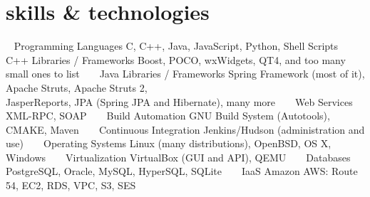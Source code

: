 \section{skills \& technologies}

\begin{entrylist}
    \entry
        {~}
        {Programming Languages}
        {C, C++, Java, JavaScript, Python, Shell Scripts}
        {~}
    \entry
        {~}
        {C++ Libraries / Frameworks}
        {Boost, POCO, wxWidgets, QT4, and too many small ones to list}
        {~}
    \entry
        {~}
        {Java Libraries / Frameworks}
        {Spring Framework (most of it), Apache Struts, Apache Struts 2,\\
        JasperReports, JPA (Spring JPA and Hibernate), many more}
        {~}
    \entry
        {~}
        {Web Services}
        {XML-RPC, SOAP}
        {~}
    \entry
        {~}
        {Build Automation}
        {GNU Build System (Autotools), CMAKE, Maven}
        {~}
    \entry
        {~}
        {Continuous Integration}
        {Jenkins/Hudson (administration and use)}
        {~}
    \entry
        {~}
        {Operating Systems}
        {Linux (many distributions), OpenBSD, OS X, Windows}
        {~}
    \entry
        {~}
        {Virtualization}
        {VirtualBox (GUI and API), QEMU}
        {~}
    \entry
        {~}
        {Databases}
        {PostgreSQL, Oracle, MySQL, HyperSQL, SQLite}
        {~}
    \entry
        {~}
        {IaaS}
        {Amazon AWS: Route 54, EC2, RDS, VPC, S3, SES}
        {~}
\end{entrylist}
